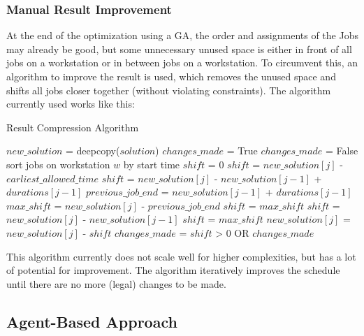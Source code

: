 \documentclass[a4paper,12pt,twoside]{scrreprt}
\begin{document}
\begin{flushleft}
\subsubsection{Manual Result Improvement}
At the end of the optimization using a GA, the order and assignments of the Jobs may already be good, but some unnecessary unused space is either in front of all jobs on a workstation or in between jobs on a workstation. To circumvent this, an algorithm to improve the result is used, which removes the unused space and shifts all jobs closer together (without violating constraints).
The algorithm currently used works like this:
\begin{algorithm}[H]
	\label{Result Compression Algorithm}
	\caption{Result Compression Algorithm}
\begin{algorithmic}
	\STATE $new\_solution$ = deepcopy($solution$)
	\STATE $changes\_made$ = True
		\STATE $changes\_made$ = False
			\STATE sort jobs on workstation $w$ by start time
					\STATE $shift$ = 0
						\STATE $shift$ = $new\_solution[j]$ - $earliest\_allowed\_time$
					\ELSE
						\STATE $shift$ = $new\_solution[j]$ - $new\_solution[j-1]$ + $durations[j-1]$
					\ENDIF
				\ELSE
					\STATE $previous\_job\_end$ = $new\_solution[j-1]$ + $durations[j-1]$
					\STATE $max\_shift$ = $new\_solution[j]$ - $previous\_job\_end$
						\STATE $shift$ = $max\_shift$
					\ELSE
						\STATE $shift$ = $new\_solution[j]$ - $new\_solution[j-1]$
							\STATE $shift$ = $max\_shift$
						\ENDIF
					\ENDIF
				\ENDIF
				\STATE $new\_solution[j]$ = $new\_solution[j]$ - $shift$
				\STATE $changes\_made$ = $shift$ > 0 OR $changes\_made$
			\ENDFOR
		\ENDFOR
	\ENDWHILE
\end{algorithmic}
\end{algorithm}
This algorithm currently does not scale well for higher complexities, but has a lot of potential for improvement.
The algorithm iteratively improves the schedule until there are no more (legal) changes to be made.

\subsection{Agent-Based Approach}


\end{flushleft}
\end{document}
